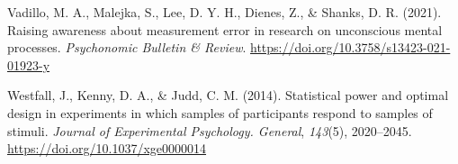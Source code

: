 \documentclass[
  man]{apa6}
\newlength{\cslhangindent}
\newlength{\cslentryspacingunit} %
\newenvironment{CSLReferences}[2] %
 {%
  \setlength{\parindent}{0pt}
  \ifodd #1
  \let\oldpar\par
  \def\par{\hangindent=\cslhangindent\oldpar}
  \fi
  \setlength{\parskip}{#2\cslentryspacingunit}
 }%
 {}
\begin{document}
\begin{CSLReferences}{1}{0}
\leavevmode{}%
Vadillo, M. A., Malejka, S., Lee, D. Y. H., Dienes, Z., \& Shanks, D. R. (2021). Raising awareness about measurement error in research on unconscious mental processes. \emph{Psychonomic Bulletin \& Review}. \url{https://doi.org/10.3758/s13423-021-01923-y}

\leavevmode{}%
Westfall, J., Kenny, D. A., \& Judd, C. M. (2014). Statistical power and optimal design in experiments in which samples of participants respond to samples of stimuli. \emph{Journal of Experimental Psychology. General}, \emph{143}(5), 2020--2045. \url{https://doi.org/10.1037/xge0000014}

\end{CSLReferences}
\end{document}
